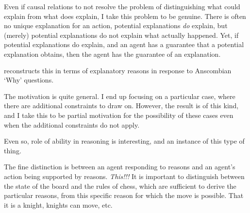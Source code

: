 \documentclass[10pt]{article}
\begin{document}
Even if causal relations to not resolve the problem of distinguishing what could explain from what does explain, I take this problem to be genuine.
There is often no unique explanation for an action, potential explanations \emph{do} explain, but (merely) potential explanations do not explain what actually happened.
Yet, if potential explanations do explain, and an agent has a guarantee that a potential explanation obtains, then the agent has the guarantee of an explanation.

\begin{note}
  \citeauthor{Neta:2019aa} reconstructs this in terms of explanatory reasons in response to Anscombian `Why' questions.
\end{note}



{
  \color{red}
  The \citeauthor{Davidson:1963aa} motivation is quite general.
  I end up focusing on a particular case, where there are additional constraints to draw on.
  However, the result is of this kind, and I take this to be partial motivation for the possibility of these cases even when the additional constraints do not apply.

  Even so, role of ability in reasoning is interesting, and an instance of this type of thing.
}


\begin{note}
  The fine distinction is between an agent responding to reasons and an agent's action being supported by reasons.
  {
    \color{red}
    \emph{This!!!}
  }
  It is important to distinguish between the state of the board and the rules of chess, which are sufficient to derive the particular reasons, from this specific reason for which the move is possible.
  That it is a knight, knights can move, etc.
\end{note}
\end{document}
